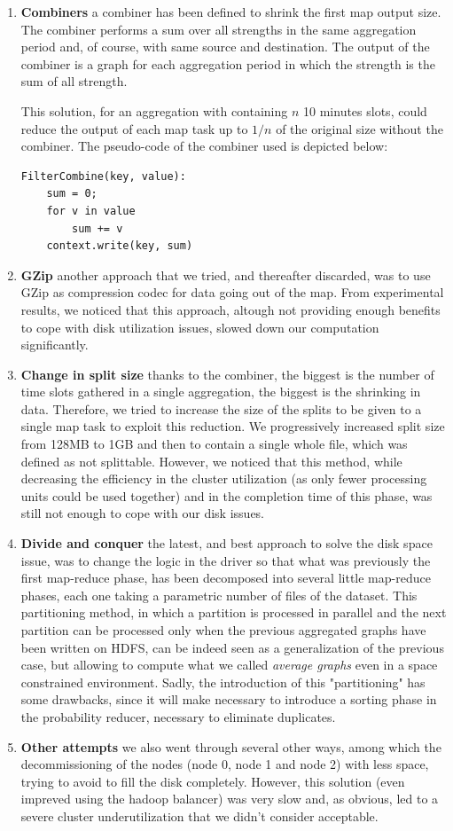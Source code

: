\begin{enumerate}
\item \textbf{Combiners} a combiner has been defined to shrink the first map output size. The combiner performs a sum over all strengths in the same aggregation period and, of course, with same source and destination. 
The output of the combiner is a graph for each aggregation period in which the strength is the sum of all strength.

This solution, for an aggregation with containing $n$ 10 minutes slots, could reduce the output of each map task up to $1/n$ of the original size without the combiner. 
The pseudo-code of the combiner used is depicted below:
\begin{verbatim}
FilterCombine(key, value):
	sum = 0;
	for v in value
		sum += v
	context.write(key, sum)
\end{verbatim}
\item \textbf{GZip} another approach that we tried, and thereafter discarded, was to use GZip as compression codec for data going out of the map. From experimental results, we noticed that this approach, altough not providing enough benefits
to cope with disk utilization issues, slowed down our computation significantly.
\item \textbf{Change in split size} thanks to the combiner, the biggest is the number of time slots gathered in a single aggregation, the biggest is the shrinking in data. 
Therefore, we tried to increase the size of the splits to be given to a single map task to exploit this reduction. We progressively increased split size from 128MB to 1GB and then to contain a single whole file, which was defined as not splittable.
However, we noticed that this method, while decreasing the efficiency in the cluster utilization (as only fewer processing units could be used together) and in the completion time of this phase, was still not enough to cope with our disk issues.
\item \textbf{Divide and conquer} the latest, and best approach to solve the disk space issue, was to change the logic in the driver so that what was previously the first map-reduce phase, has been decomposed into several little map-reduce phases, each one taking a parametric number of files of the dataset.
This partitioning method, in which a partition is processed in parallel and the next partition can be processed only when the previous aggregated graphs have been written on HDFS, can be indeed seen as a generalization of the previous case, but allowing to compute what we called \emph{average graphs} even in a space constrained environment. 
Sadly, the introduction of this "partitioning" has some drawbacks, since it will make necessary to introduce a sorting phase in the probability reducer, necessary to eliminate duplicates.
\item \textbf{Other attempts} we also went through several other ways, among which the decommissioning of the nodes (node 0, node 1 and node 2) with less space, trying to avoid to fill the disk completely.
However, this solution (even impreved using the hadoop balancer) was very slow and, as obvious, led to a severe cluster underutilization that we didn't consider acceptable.
\end{enumerate}
